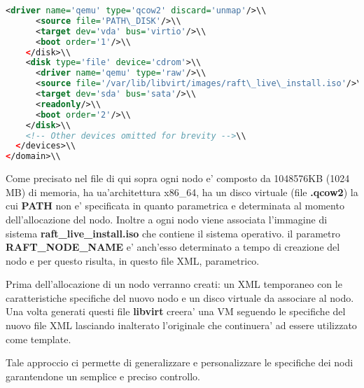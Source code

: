 \begin{lstlisting}[language=XML]
      <driver name='qemu' type='qcow2' discard='unmap'/>\\
      <source file='PATH\_DISK'/>\\
      <target dev='vda' bus='virtio'/>\\
      <boot order='1'/>\\
    </disk>\\
    <disk type='file' device='cdrom'>\\
      <driver name='qemu' type='raw'/>\\
      <source file='/var/lib/libvirt/images/raft\_live\_install.iso'/>\\
      <target dev='sda' bus='sata'/>\\
      <readonly/>\\
      <boot order='2'/>\\
    </disk>\\
    <!-- Other devices omitted for brevity -->\\
  </devices>\\
</domain>\\
\end{lstlisting}

Come precisato nel file di qui sopra ogni nodo e' composto da 1048576KB (1024 MB) di memoria,
ha ua'architettura x86\_64, ha un disco virtuale (file \textbf{.qcow2}) la cui \textbf{PATH} 
non e' specificata in quanto parametrica e determinata al momento dell'allocazione del nodo.
Inoltre a ogni nodo viene associata l'immagine di sistema \textbf{raft\_live\_install.iso} che 
contiene il sistema operativo. il parametro \textbf{RAFT\_NODE\_NAME} e' anch'esso determinato
a tempo di creazione del nodo e per questo risulta, in questo file XML, parametrico.

Prima dell'allocazione di un nodo verranno creati: un XML temporaneo con le caratteristiche 
specifiche del nuovo nodo e un disco virtuale da associare al nodo. 
Una volta generati questi file \textbf{libvirt} creera' una VM seguendo le specifiche del 
nuovo file XML lasciando inalterato l'originale che continuera' ad essere utilizzato come template.

Tale approccio ci permette di generalizzare e personalizzare le specifiche dei nodi garantendone
un semplice e preciso controllo.



